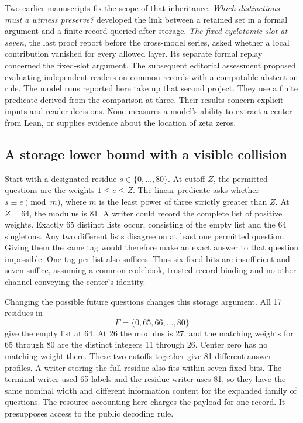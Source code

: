 \documentclass[12pt,letterpaper]{article}
\begin{document}
Two earlier manuscripts fix the scope of that inheritance. \emph{Which distinctions must a witness preserve?} developed the link between a retained set in a formal argument and a finite record queried after storage. \emph{The fixed cyclotomic slot at seven}, the last proof report before the cross-model series, asked whether a local contribution vanished for every allowed layer. Its separate formal replay concerned the fixed-slot argument. The subsequent editorial assessment proposed evaluating independent readers on common records with a computable abstention rule. The model runs reported here take up that second project. They use a finite predicate derived from the comparison at three. Their results concern explicit inputs and reader decisions. None measures a model's ability to extract a center from Lean, or supplies evidence about the location of zeta zeros.

\subsection{A storage lower bound with a visible collision}

Start with a designated residue \(s\in\{0,\ldots,80\}\). At cutoff \(Z\), the permitted questions are the weights \(1\leq e\leq Z\). The linear predicate asks whether \(s\equiv e\pmod{m}\), where \(m\) is the least power of three strictly greater than \(Z\). At \(Z=64\), the modulus is 81. A writer could record the complete list of positive weights. Exactly 65 distinct lists occur, consisting of the empty list and the 64 singletons. Any two different lists disagree on at least one permitted question. Giving them the same tag would therefore make an exact answer to that question impossible. One tag per list also suffices. Thus six fixed bits are insufficient and seven suffice, assuming a common codebook, trusted record binding and no other channel conveying the center's identity.

Changing the possible future questions changes this storage argument. All 17 residues in
\[
  F=\{0,65,66,\ldots,80\}
\]
give the empty list at 64. At 26 the modulus is 27, and the matching weights for 65 through 80 are the distinct integers 11 through 26. Center zero has no matching weight there. These two cutoffs together give 81 different answer profiles. A writer storing the full residue also fits within seven fixed bits. The terminal writer used 65 labels and the residue writer uses 81, so they have the same nominal width and different information content for the expanded family of questions. The resource accounting here charges the payload for one record. It presupposes access to the public decoding rule.
\end{document}
